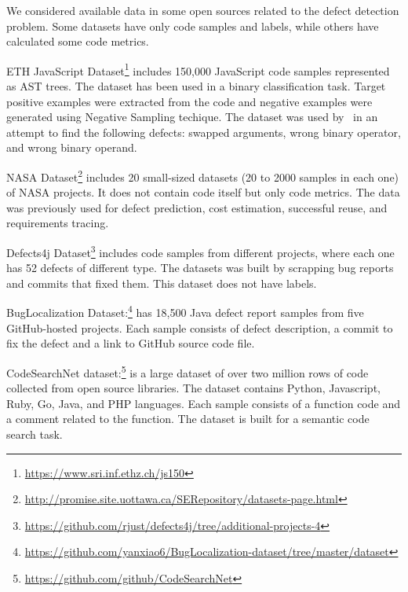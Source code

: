 We considered available data in some open sources 
related to the defect detection problem. Some datasets 
have only code samples and labels, while others have 
calculated some code metrics.

ETH JavaScript Dataset\footnote{\url{https://www.sri.inf.ethz.ch/js150}}
includes 150,000 JavaScript code samples represented as AST trees. 
The dataset has been used in a binary classification task. 
Target positive examples were extracted from the code 
and negative examples were generated using 
Negative Sampling techique. The dataset 
was used by~\citet{DeepBugs} in an attempt to find the following defects: 
swapped arguments, wrong binary operator, and wrong binary operand.

NASA Dataset\footnote{\url{http://promise.site.uottawa.ca/SERepository/datasets-page.html}}
includes 20 small-sized datasets (20 to 2000 samples in each one) of NASA projects. 
It does not contain code itself but only code metrics. The data 
was previously used for defect prediction, cost estimation, successful reuse, and requirements tracing.
 
Defects4j Dataset\footnote{\url{https://github.com/rjust/defects4j/tree/additional-projects-4}}
includes code samples from different projects, 
where each one has 52 defects of different 
type. The datasets was built by scrapping bug reports and commits 
that fixed them. This dataset does not have labels.

BugLocalization Dataset:\footnote{\url{https://github.com/yanxiao6/BugLocalization-dataset/tree/master/dataset}}
has 18,500 Java defect report samples from five GitHub-hosted projects. 
Each sample consists of defect description, a commit to fix the defect 
and a link to GitHub source code file.

CodeSearchNet dataset:\footnote{\url{https://github.com/github/CodeSearchNet}}
is a large dataset of over two million rows of code 
collected from open source libraries. The dataset contains 
Python, Javascript, Ruby, Go, Java, and PHP languages. 
Each sample consists of a function code and a comment related 
to the function. The dataset is built for a semantic code search task.
